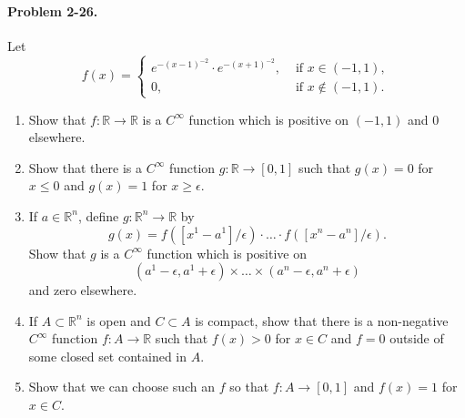 \documentclass[11pt]{report}
\newcommand{\R}{\mathbb{R}}
\newcommand{\problem}[1]{\paragraph{Problem #1.}}
\begin{document}
    \problem{2-26} Let \[
        f(x) = \begin{cases}
            e^{-(x - 1)^{-2}}\cdot e^{-(x + 1)^{-2}}, &\text{ if }x \in (-1, 1), \\
            0, &\text{ if }x \notin (-1, 1).
        \end{cases}
    \] \begin{enumerate}
        \item Show that $f\colon \R \to \R$ is a $C^\infty$ function which is
        positive on $(-1, 1)$ and $0$ elsewhere.

        \item Show that there is a $C^\infty$ function $g\colon \R \to [0, 1]$ such
        that $g(x) = 0$ for $x \leq 0$ and $g(x) = 1$ for $x \geq \epsilon$.

        \item If $a \in \R^n$, define $g\colon \R^n \to \R$ by \[
            g(x) = f([x^1 - a^1] / \epsilon) \cdot \dots \cdot f([x^n - a^n] /
            \epsilon).
        \] Show that $g$ is a $C^\infty$ function which is positive on \[
            (a^1 - \epsilon, a^1 + \epsilon) \times \dots \times (a^n - \epsilon, a^n
            + \epsilon)
        \] and zero elsewhere.

        \item If $A \subset \R^n$ is open and $C \subset A$ is compact, show that
        there is a non-negative $C^\infty$ function $f\colon A \to \R$ such that
        $f(x) > 0$ for $x \in C$ and $f = 0$ outside of some closed set contained in
        $A$.

        \item Show that we can choose such an $f$ so that $f\colon A \to [0, 1]$ and
        $f(x) = 1$ for $x \in C$.
    \end{enumerate}
\end{document}
